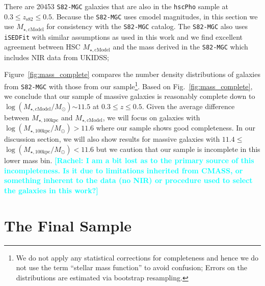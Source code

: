 \documentclass[a4paper,fleqn,usenatbib]{mnras}
\def\redm{\texttt{redMaPPer}}
\def\rbcg{\texttt{cenHighMh}}
\def\nbcg{\texttt{cenLowMh}}
\def\mstar{{$M_{\star}$}}
\def\mtot{{$M_{\star,100\mathrm{kpc}}$}}
\def\mcmodel{{$M_{\star,\mathrm{cModel}}$}}
\def\logmtot{{$\log (M_{\star,100\mathrm{kpc}}/M_{\odot})$}}
\def\logmcmodel{{$\log (M_{\star,\mathrm{cModel}}/M_{\odot})$}}
\newcommand{\rachel}[1]{\textcolor{cyan}{\textbf{[Rachel: #1]}}}
\begin{document}
    There are 20453 \texttt{S82-MGC} galaxies that are also in the \texttt{hscPho} 
    sample at $0.3 \leq z_{\mathrm{s82}} \leq 0.5$.  Because the \texttt{S82-MGC} uses  cmodel  magnitudes,  in this section we use  \mcmodel{} for consistency with the  \texttt{S82-MGC} catalog.  The \texttt{S82-MGC} also uses \texttt{iSEDFit} with similar assumptions as used in this work and we find excellent agreement between HSC  \mcmodel{} and the mass derived in  the \texttt{S82-MGC} which includes NIR data from UKIDSS; 
    
    Figure~\ref{fig:mass_complete} compares the number density distributions of galaxies from \texttt{S82-MGC} with those from our sample\footnote{We do not apply any statistical corrections for completeness and hence we do not use the term ``stellar mass function'' to avoid confusion;
    Errors on the distributions are estimated via bootstrap resampling.}. 
    Based on Fig.~\ref{fig:mass_complete}, we conclude that our sample of massive 
    galaxies is reasonably complete down to \logmcmodel{}${\sim} 11.5$ at 
    $0.3 \leq z \leq 0.5$. 
    Given the average difference between \mtot{} and \mcmodel{}, we will focus on galaxies with \logmtot{}$> 11.6$ where our sample shows good completeness. In our discussion section, we will also show results for massive galaxies with $11.4 \le$\logmtot{}$<11.6$ but we caution that our sample is incomplete in this  lower mass bin.
\rachel{I am a bit lost as to the primary source of this incompleteness.  Is it due to limitations inherited from CMASS, or something inherent to the data (no NIR) or procedure used to select the galaxies in this work?}

    

\section{The Final Sample}
    \label{sec:final}
    
\end{document}
